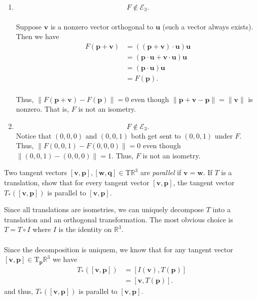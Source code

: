 \documentclass[12 pt, letterpaper]{hmcpset}
\begin{document}
\begin{solution}
\begin{enumerate}
		\item
			\[
				\boxed{
					F \notin \mathcal{E}_{3}.
				}
			\] \\
			Suppose $\mathbf{v}$ is a nonzero vector orthogonal to $\mathbf{u}$ (such a vector always exists). Then we have
			\[
				\begin{split}
					F(\mathbf{p} + \mathbf{v}) & = ((\mathbf{p} + \mathbf{v}) \cdot \mathbf{u}) \mathbf{u} \\
								   & = (\mathbf{p} \cdot \mathbf{u} + \mathbf{v} \cdot \mathbf{u}) \mathbf{u} \\
								   & = (\mathbf{p} \cdot \mathbf{u}) \mathbf{u}	\\
								   & = F(\mathbf{p}).
				\end{split}
			\] \\
			Thus, $\lVert F(\mathbf{p} + \mathbf{v}) - F(\mathbf{p}) \rVert = 0$ even though $\lVert \mathbf{p} + \mathbf{v} - \mathbf{p} \rVert = \lVert \mathbf{v} \rVert$ is nonzero. That is, $F$ is not an isometry.
		\item
			\[
				\boxed{
					F \notin \mathcal{E}_{3}.
				}
			\]
			Notice that $(0, 0, 0)$ and $(0, 0, 1)$ both get sent to $(0, 0, 1)$ under $F$. Thus, $\lVert F(0, 0, 1) - F(0, 0, 0) \rVert = 0$ even though $\lVert (0, 0, 1) - (0, 0, 0) \rVert = 1$. Thus, $F$ is not an isometry.
	\end{enumerate}
\end{solution}

\pagebreak

\begin{problem}[Problem 4.]
	Two tangent vectors $[\mathbf{v}, \mathbf{p}], [\mathbf{w}, \mathbf{q}] \in \mathrm{T}\mathbb{R}^{3}$ are \textit{parallel} if $\mathbf{v} = \mathbf{w}$. If $T$ is a translation, show that for every tangent vector $[\mathbf{v}, \mathbf{p}]$, the tangent vector $T_{*}([\mathbf{v}, \mathbf{p}])$ is parallel to $[\mathbf{v}, \mathbf{p}]$.
\end{problem}

\begin{solution}
	Since all translations are isometries, we can uniquely decompose $T$ into a translation and an orthogonal transformation. The most obvious choice is $T = T \circ I$ where $I$ is the identity on $\mathbb{R}^{3}$. \\\\
	Since the decomposition is uniquem, we know that for any tangent vector $[\mathbf{v}, \mathbf{p}] \in \mathrm{T}_{\mathbf{p}} \mathbb{R}^{3}$ we have
	\[
		\begin{split}
			T_{*}([\mathbf{v}, \mathbf{p}]) & = [I(\mathbf{v}), T(\mathbf{p})] \\
							& = [\mathbf{v}, T(\mathbf{p})].
		\end{split} 
	\]
	and thus, $T_{*}([\mathbf{v}, \mathbf{p}])$ is parallel to $[\mathbf{v}, \mathbf{p}]$.
\end{solution}
\end{document}
